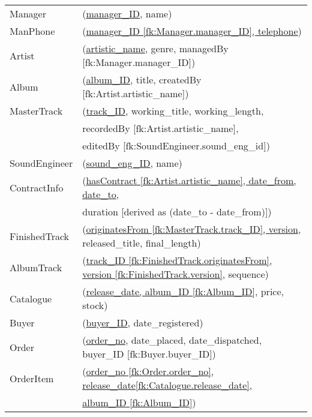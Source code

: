 \documentclass[11pt,a4paper]{article}
\begin{document}
\begin{table}[h]
 

\begin{tabular}{ll}
Manager    & (\underline{manager\_ID}, name) \\

ManPhone   & (\underline{manager\_ID [fk:Manager.manager\_ID], telephone}) \\

Artist	   & (\underline{artistic\_name}, 
						 genre,
						 managedBy [fk:Manager.manager\_ID]) \\

Album	     & (\underline{album\_ID}, 
						 title, 
						 createdBy [fk:Artist.artistic\_name])\\

MasterTrack & (\underline{track\_ID}, working\_title, working\_length, \\
            &	 	 recordedBy [fk:Artist.artistic\_name], \\
            &	 	 editedBy [fk:SoundEngineer.sound\_eng\_id])\\

SoundEngineer & (\underline{sound\_eng\_ID}, name)\\

ContractInfo & (\underline{hasContract [fk:Artist.artistic\_name], 
							 date\_from, date\_to},\\
             & duration [derived as (date\_to - date\_from)])\\

FinishedTrack & (\underline{originatesFrom [fk:MasterTrack.track\_ID],
							  version}, released\_title, final\_length)\\

AlbumTrack & (\underline{track\_ID [fk:FinishedTrack.originatesFrom],
             version [fk:FinishedTrack.version]}, sequence)\\

Catalogue & (\underline{release\_date, album\_ID [fk:Album\_ID]},
            price, stock)\\

Buyer & (\underline{buyer\_ID}, date\_registered)\\

Order & (\underline{order\_no}, date\_placed, date\_dispatched, 
        buyer\_ID [fk:Buyer.buyer\_ID])\\

OrderItem & (\underline{order\_no [fk:Order.order\_no], 
            release\_date[fk:Catalogue.release\_date], }\\
          &  \underline{album\_ID [fk:Album\_ID]})\\


\end{tabular}
\end{table}
\end{document}
